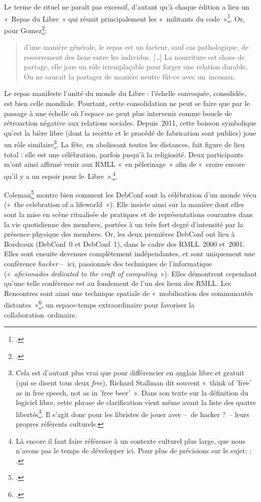 \documentclass{FramateX}
\begin{document}
\begin{refsection}
Le terme de rituel ne paraît pas excessif, d'autant qu'à chaque édition
a lieu un «~Repas du Libre~» qui réunit principalement les
«~militants du
code~»\footnote{\cite{proulxles2006}.}. Or, pour
Gomez\footnote{\cite{gomezrepas1985}.}:

\begin{quote}
d'une manière générale, le repas est un facteur, sauf cas
pathologique, de resserrement des liens entre les individus. […] La
nourriture est chose de partage, elle joue un rôle irremplaçable pour
forger une relation durable. On ne saurait la partager de manière
neutre fût-ce avec un~inconnu.
\end{quote}

Le repas manifeste l'unité du monde du Libre : l'échelle convoquée,
consolidée, est bien celle mondiale. Pourtant, cette consolidation ne
peut se faire que par le passage à une échelle où l'espace ne peut plus
intervenir comme boucle de rétroaction négative aux relations sociales.
Depuis~2011, cette boisson symbolique qu'est la bière libre (dont la
recette et le procédé de fabrication sont publics) joue un rôle
similaire\footnote{Cela est d'autant plus vrai que pour différencier en
anglais libre et gratuit (qui se disent tous deux \textit{free}),
Richard Stallman dit souvent «~think of 'free' as in free speech, not as in
 'free beer'~». Dans son texte sur la
définition du logiciel libre, cette phrase de clarification vient même
avant la liste des quatre libertés\footnote{\cite[p.~43]{stallmanfree2002-1}.}. Il s'agit donc pour les libristes de jouer avec –~de hacker
?~– leurs propres référents culturels.}. La fête, en abolissant toutes
les distances, fait figure de lieu total : elle est une célébration,
parfois jusqu'à la religiosité. Deux participants m'ont ainsi affirmé
venir aux RMLL «~en pèlerinage~» afin de
«~croire encore qu'il y a un espoir pour
le~Libre~».\footnote{Là encore il faut faire référence à un contexte
culturel plus large, que nous n'avons pas le temps de développer ici.
Pour plus de précisions sur le sujet: \cite[p.~64-94]{keltytwo2008}; \cite[p.~85-94]{giraudles2010}.}.

Coleman\footnote{\cite{colemanhacker2010}.} montre bien comment les DebConf sont la célébration d'un monde vécu
(«~the celebration of a
lifeworld~»). Elle insiste ainsi sur la manière dont elles sont la
mise en scène ritualisée de pratiques et de représentations courantes
dans la vie quotidienne des membres, portées à un très fort degré
d'intensité par la présence physique des membres. Or, les deux
premières DebConf ont lieu à Bordeaux (DebConf~0 et DebConf~1), dans le
cadre des RMLL~2000 et~2001. Elles sont ensuite devenues complètement
indépendantes, et sont uniquement une conférence \textit{hacker} –~ici, passionnés
des techniques de l'informatique («~\textit{aficionados dedicated to the
craft of computing}~»). Elles démontrent cependant qu'une telle
conférence est au fondement de l'un des lieux des RMLL. Les Rencontres
sont ainsi une technique spatiale de «~mobilisation
des communautés
distantes~»\footnote{\cite{jullienhow2006}.}, un espace-temps extraordinaire pour favoriser la
collaboration~ordinaire.


\end{refsection}
\end{document}
